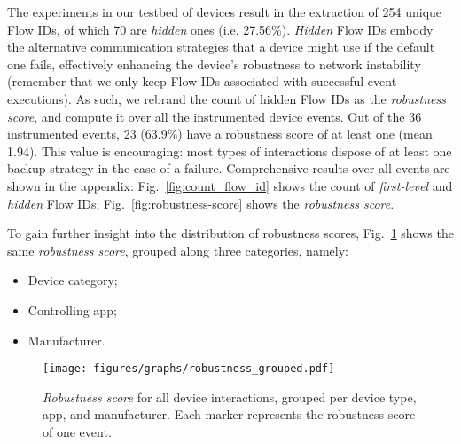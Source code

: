 
The experiments in our testbed of devices result in
the extraction of 254 unique Flow IDs,
of which 70 are \emph{hidden} ones
(i.e. 27.56\%).
\emph{Hidden} Flow IDs embody the alternative communication strategies
that a device might use if the default one fails,
effectively enhancing the device's robustness to network instability (remember that we only keep Flow IDs associated with successful event executions).
As such, we rebrand the count of hidden Flow IDs
as the \emph{robustness score},
and compute it over all the instrumented device events.
Out of the 36 instrumented events,
23 (63.9\%) have a robustness score of at least one (mean 1.94).
This value is encouraging:
most types of interactions dispose of at least one backup strategy
in the case of a failure.
Comprehensive results over all events are shown in the appendix:
Fig.~\ref{fig:count_flow_id} shows the count of
\emph{first-level} and \emph{hidden} Flow IDs;
Fig.~\ref{fig:robustness-score} shows the \emph{robustness score}.

To gain further insight into the distribution of robustness scores,
Fig.~\ref{fig:robustness-grouped} shows the same \emph{robustness score},
grouped along three categories, namely:
\begin{itemize}
  \item Device category;
  \item Controlling app;
  \item Manufacturer.
\end{itemize}

\begin{figure}
  \centering
  \texttt{[image: figures/graphs/robustness\_grouped.pdf]}
  \caption{\emph{Robustness score} for all device interactions, grouped per device type, app, and manufacturer. Each marker represents the robustness score of one event.}
  \label{fig:robustness-grouped}
\end{figure}

